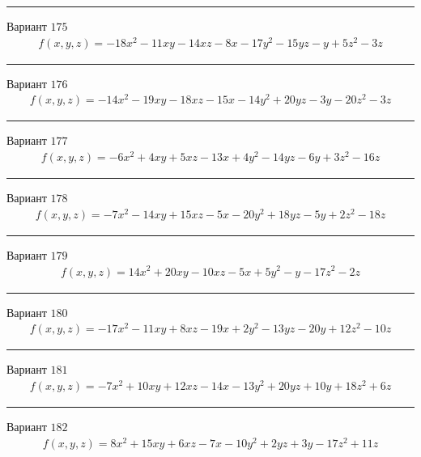 \documentclass[11pt]{report}
\begin{document}
\begin{center}
\noindent\rule{8cm}{0.4pt}
\end{center}
Вариант $175$
\begin{align*}
    f(x, y, z) = - 18 x^{2} - 11 x y - 14 x z - 8 x - 17 y^{2} - 15 y z - y + 5 z^{2} - 3 z
\end{align*}
\begin{center}
\noindent\rule{8cm}{0.4pt}
\end{center}
Вариант $176$
\begin{align*}
    f(x, y, z) = - 14 x^{2} - 19 x y - 18 x z - 15 x - 14 y^{2} + 20 y z - 3 y - 20 z^{2} - 3 z
\end{align*}
\begin{center}
\noindent\rule{8cm}{0.4pt}
\end{center}
Вариант $177$
\begin{align*}
    f(x, y, z) = - 6 x^{2} + 4 x y + 5 x z - 13 x + 4 y^{2} - 14 y z - 6 y + 3 z^{2} - 16 z
\end{align*}
\begin{center}
\noindent\rule{8cm}{0.4pt}
\end{center}
Вариант $178$
\begin{align*}
    f(x, y, z) = - 7 x^{2} - 14 x y + 15 x z - 5 x - 20 y^{2} + 18 y z - 5 y + 2 z^{2} - 18 z
\end{align*}
\begin{center}
\noindent\rule{8cm}{0.4pt}
\end{center}
Вариант $179$
\begin{align*}
    f(x, y, z) = 14 x^{2} + 20 x y - 10 x z - 5 x + 5 y^{2} - y - 17 z^{2} - 2 z
\end{align*}
\begin{center}
\noindent\rule{8cm}{0.4pt}
\end{center}
Вариант $180$
\begin{align*}
    f(x, y, z) = - 17 x^{2} - 11 x y + 8 x z - 19 x + 2 y^{2} - 13 y z - 20 y + 12 z^{2} - 10 z
\end{align*}
\begin{center}
\noindent\rule{8cm}{0.4pt}
\end{center}
Вариант $181$
\begin{align*}
    f(x, y, z) = - 7 x^{2} + 10 x y + 12 x z - 14 x - 13 y^{2} + 20 y z + 10 y + 18 z^{2} + 6 z
\end{align*}
\begin{center}
\noindent\rule{8cm}{0.4pt}
\end{center}
Вариант $182$
\begin{align*}
    f(x, y, z) = 8 x^{2} + 15 x y + 6 x z - 7 x - 10 y^{2} + 2 y z + 3 y - 17 z^{2} + 11 z
\end{align*}
\end{document}
